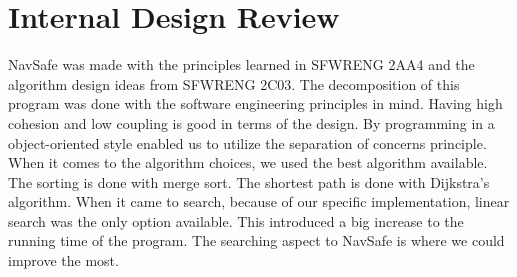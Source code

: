 \documentclass[12pt]{article}
\begin{document}
\newpage
\section{Internal Design Review}
NavSafe was made with the principles learned in SFWRENG 2AA4 and the algorithm design ideas from SFWRENG 2C03. The decomposition of this program was done with the software engineering principles in mind. Having high cohesion and low coupling is good in terms of the design. By programming in a object-oriented style enabled us to utilize the separation of concerns principle. When it comes to the algorithm choices, we used the best algorithm available. The sorting is done with merge sort. The shortest path is done with Dijkstra's algorithm. When it came to search, because of our specific implementation, linear search was the only option available. This introduced a big increase to the running time of the program. The searching aspect to NavSafe is where we could improve the most.
\end{document}
